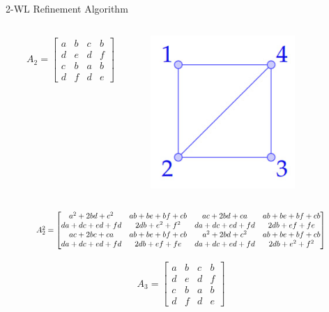 \documentclass{beamer}
\begin{document}
\addtocounter{framenumber}{-1}
\begin{frame}{2-WL Refinement Algorithm}
    \begin{columns}
        \begin{column}{0.7\textwidth}
        \begin{align*}
            A_2 = \begin{bmatrix}
                a&b&c&b\\
                d&e&d&f\\
                c&b&a&b\\
                d&f&d&e
            \end{bmatrix}
        \end{align*}
        \end{column}

        \begin{column}{0.3\textwidth}
            \centering
            \includegraphics[width=0.7\textwidth]{slides/pic_1.jpg}
        \end{column}
    \end{columns}
    
    \vspace{1em}
    \[
    \scalebox{0.8}{
    $
        A_2^2 = \begin{bmatrix}
            a^2+2bd+c^2 & ab+be+bf+cb&ac+2bd+ca & ab+be+bf+cb\\
            da+dc+ed+fd&2db+e^2+f^2&da+dc+ed+fd&2db+ef+fe\\
            ac+2bc+ca&ab+be+bf+cb&a^2+2bd+c^2&ab+be+bf+cb\\
            da+dc+ed+fd & 2db+ef+fe & da+dc+ed+fd & 2db+e^2+f^2
        \end{bmatrix}
    $
    }
    \]

    \vspace{1em}
    \begin{align*}
        A_3 = \begin{bmatrix}
            a&b&c&b\\
            d&e&d&f\\
            c&b&a&b\\
            d&f&d&e
        \end{bmatrix}
    \end{align*}
\end{frame}
\end{document}
